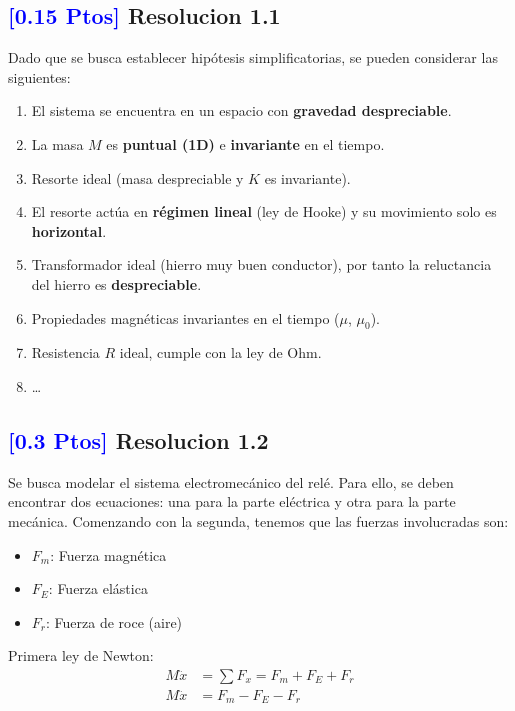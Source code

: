 \documentclass[
  11pt,
  letterpaper,
   addpoints,
  ]{exam}
\begin{document}
\begin{solution}
  \subsection*{\textcolor{blue}{[0.15 Ptos]} Resolucion 1.1}

    Dado que se busca establecer hipótesis simplificatorias, se pueden considerar las siguientes:

    \begin{enumerate}
      \item El sistema se encuentra en un espacio con \textbf{gravedad despreciable}.
      \item La masa $M$ es \textbf{puntual (1D)} e \textbf{invariante} en el tiempo.
      \item Resorte ideal (masa despreciable y $K$ es invariante).
      \item El resorte actúa en \textbf{régimen lineal} (ley de Hooke) y su movimiento solo es \textbf{horizontal}.
      \item Transformador ideal (hierro muy buen conductor), por tanto la reluctancia del hierro es \textbf{despreciable}.
      \item Propiedades magnéticas invariantes en el tiempo ($\mu$, $\mu_0$).
      \item Resistencia $R$ ideal, cumple con la ley de Ohm.
      \item \dots
    \end{enumerate}
    \subsection*{\textcolor{blue}{[0.3 Ptos]} Resolucion 1.2}
      Se busca modelar el sistema electromecánico del relé. Para ello, se deben encontrar dos ecuaciones: una para la parte eléctrica y otra para la parte mecánica. Comenzando con la segunda, tenemos que las fuerzas involucradas son:

      \begin{itemize}
        \item $F_m$: Fuerza magnética
        \item $F_E$: Fuerza elástica
        \item $F_r$: Fuerza de roce (aire)
      \end{itemize}

      Primera ley de Newton:
      \begin{align}
        M \ddot{x} &= \sum F_x = F_m + F_E + F_r\\
        M \ddot{x} &= F_m - F_E - F_r
      \end{align}


\end{solution}
\end{document}
